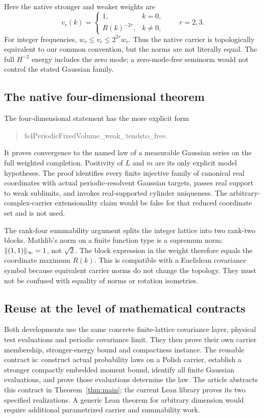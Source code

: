Here the native stronger and weaker weights are
\[
 v_r(k)=\begin{cases}1,&k=0,\\R(k)^{-2r},&k\ne0,\end{cases}
 \qquad r=2,3.
\]
For integer frequencies, $w_r\leq v_r\leq2^{2r}w_r$. Thus the native carrier
is topologically equivalent to our common convention, but the norms are
not literally equal. The full $H^{-2}$ energy includes the zero mode; a
zero-mode-free seminorm would not control the stated Gaussian family.

\subsection{The native four-dimensional theorem}
The four-dimensional statement has the more explicit form
\begin{quote}\ttfamily\raggedright
fs4PeriodicFixedVolume\_weak\_tendsto\_free.
\end{quote}
It proves convergence to the named law of a measurable Gaussian series on
the full weighted completion. Positivity of $L$ and $m$ are its only explicit
model hypotheses. The proof identifies every finite injective family of
canonical real coordinates with actual periodic-resolvent Gaussian targets,
passes real support to weak sublimits, and invokes real-supported cylinder
uniqueness. The arbitrary-complex-carrier extensionality claim would be
false for that reduced coordinate set and is not used.

The rank-four summability argument splits the integer lattice into two
rank-two blocks. Mathlib's norm on a finite function type is a supremum norm:
$\lVert(1,1)\rVert_\infty=1$, not $\sqrt2$. The block expression in the weight
therefore equals the coordinate maximum $R(k)$. This is compatible with a
Euclidean covariance symbol because equivalent carrier norms do not change
the topology. They must not be confused with equality of norms or rotation
isometries.

\subsection{Reuse at the level of mathematical contracts}
Both developments use the same concrete finite-lattice covariance layer,
physical test evaluations and periodic covariance limit. They then prove their
own carrier membership, stronger-energy bound and compactness instance.
The reusable contract is: construct actual probability laws on a Polish
carrier, establish a stronger compactly embedded moment bound, identify all
finite Gaussian evaluations, and prove those evaluations determine the law.
The article abstracts this contract in Theorem~\ref{thm:main}; the current
Lean library proves its two specified realizations. A generic Lean theorem
for arbitrary dimension would require additional parametrized carrier and
summability work.
